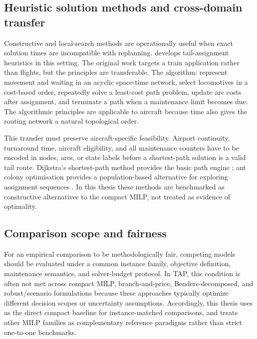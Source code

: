 \subsection{Heuristic solution methods and cross-domain transfer}

Constructive and local-search methods are operationally useful when exact
solution times are incompatible with replanning. \citet{gronkvist2005tail}
develops tail-assignment heuristics in this setting. 
The original work targets a train application rather than flights, but the principles are transferable. The algorithm:
represent movement and waiting in an acyclic space-time network, select locomotives in a
cost-based order, repeatedly solve a least-cost path problem, update arc costs
after assignment, and terminate a path when a maintenance limit becomes due. The algorithmic principles
are applicable to aircraft because time also gives the routing network a natural
topological order.

This transfer must preserve aircraft-specific feasibility. Airport continuity,
turnaround time, aircraft eligibility, and all maintenance counters have to be
encoded in nodes, arcs, or state labels before a shortest-path solution is a
valid tail route. Dijkstra's shortest-path method provides the basic path engine
\citep{dijkstra1959note}; ant colony optimisation provides a population-based
alternative for exploring assignment sequences \citep{dorigo1996ant,
dorigo2004ant}. In this thesis these methods are benchmarked as constructive
alternatives to the compact MILP, not treated as evidence of optimality.



\subsection{Comparison scope and fairness}

For an empirical comparison to be methodologically fair, competing models
should be evaluated under a common instance family, objective definition,
maintenance semantics, and solver-budget protocol.  In TAP, this condition is
often not met across compact MILP, branch-and-price, Benders-decomposed, and
robust/scenario formulations because these approaches typically optimize
different decision scopes or uncertainty assumptions.  Accordingly, this thesis
uses \citet{khaled2018compact} as the direct compact baseline for
instance-matched comparisons, and treats other MILP families as complementary
reference paradigms rather than strict one-to-one benchmarks.



